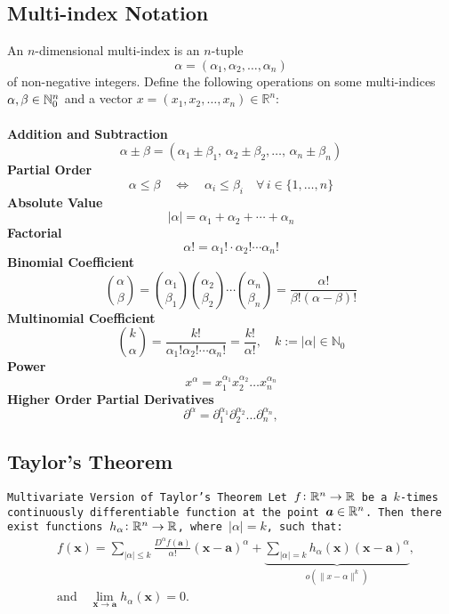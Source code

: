 \documentclass[11pt,a4paper]{article}
\begin{document}
\subsection{Multi-index Notation}
An $n$-dimensional multi-index is an $n$-tuple
\[
  \alpha = (\alpha_{1},\alpha_{2},\ldots,\alpha_{n})
\]
of non-negative integers. Define the following operations on some
multi-indices $\alpha ,\beta \in \mathbb{N}_{0}^{n}$ and a vector
$x=(x_{1},x_{2},\ldots ,x_{n})\in \mathbb {R} ^{n}$: \\
\phantom{} \\
\textbf{Addition and Subtraction}
\[
  \alpha \pm \beta =
  (\alpha _{1}\pm \beta _{1},\,\alpha _{2}\pm 
  \beta _{2},\ldots ,\,\alpha _{n}\pm \beta _{n})
\]
\textbf{Partial Order}
\[
  \alpha \leq \beta \quad \Leftrightarrow \quad 
  \alpha _{i}\leq \beta _{i}\quad \forall \,i\in \{1,\ldots ,n\}
\]
\textbf{Absolute Value}
\[
  |\alpha |=\alpha _{1}+\alpha _{2}+\cdots +\alpha _{n}
\]
\textbf{Factorial}
\[
  \alpha !=\alpha _{1}!\cdot \alpha _{2}!\cdots \alpha _{n}!
\]
\textbf{Binomial Coefficient}
\[
  {\binom {\alpha}{\beta}} = 
  {\binom {\alpha_{1}}{\beta_{1}}}
  {\binom {\alpha_{2}}{\beta_{2}}}\cdots 
  {\binom {\alpha_{n}}{\beta_{n}}} = 
  {\frac {\alpha!}{\beta! (\alpha-\beta)!}}
\]
\textbf{Multinomial Coefficient}
\[
  {\binom {k}{\alpha}} = 
  {\frac {k!}{\alpha_{1}!\alpha_{2}! \cdots \alpha_{n}!}} = 
  {\frac {k!}{\alpha!}}, 
  \quad k:=|\alpha |\in \mathbb {N}_{0}
\]
\textbf{Power}
\[
  x^{\alpha} = 
  x_{1}^{\alpha_{1}}x_{2}^{\alpha_{2}}\ldots x_{n}^{\alpha_{n}}
\]
\textbf{Higher Order Partial Derivatives}
\[
  \partial^{\alpha} = 
  \partial_{1}^{\alpha _{1}}
  \partial _{2}^{\alpha _{2}} \ldots 
  \partial _{n}^{\alpha _{n}},
\]
\subsection{Taylor's Theorem}
\tt{Multivariate Version of Taylor's Theorem}
Let $f \colon \mathbb{R}^n \to \mathbb{R}$ be a $k$-times continuously differentiable 
function at the point $\boldsymbol{a} \in \mathbb{R}^n$. Then there exist functions 
$h_\alpha \colon \mathbb{R}^n \to \mathbb{R}$, where $|\alpha| = k$, such that:
\[
  {\begin{aligned}&f({\boldsymbol {x}})=\sum _{|\alpha |\leq k}{\frac 
  {D^{\alpha }f({\boldsymbol {a}})}{\alpha !}}({\boldsymbol {x}}-
  {\boldsymbol 
  {a}})^{\alpha }+\underbrace{\sum _{|\alpha |=k}h_{\alpha }({\boldsymbol 
  {x}})({\boldsymbol {x}}-{\boldsymbol {a}})^{\alpha }}_{o(\|x-\alpha\|
  ^k)},\\&{\mbox{and}}\quad \lim _{{\boldsymbol {x}}\to {\boldsymbol {a}}}
  h_{\alpha }({\boldsymbol {x}})=0.\end{aligned}}
\]
\end{document}
